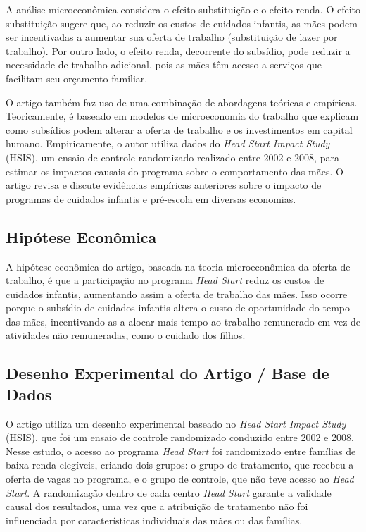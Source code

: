 \documentclass[a4paper,12pt]{article}[abntex2]
\begin{document}
A análise microeconômica considera o efeito substituição e o efeito renda. O efeito substituição sugere que, ao reduzir os custos de cuidados infantis, as mães podem ser incentivadas a aumentar sua oferta de trabalho (substituição de lazer por trabalho). Por outro lado, o efeito renda, decorrente do subsídio, pode reduzir a necessidade de trabalho adicional, pois as mães têm acesso a serviços que facilitam seu orçamento familiar.

O artigo também faz uso de uma combinação de abordagens teóricas e empíricas. Teoricamente, é baseado em modelos de microeconomia do trabalho que explicam como subsídios podem alterar a oferta de trabalho e os investimentos em capital humano. Empiricamente, o autor utiliza dados do \textit{Head Start Impact Study} (HSIS), um ensaio de controle randomizado realizado entre 2002 e 2008, para estimar os impactos causais do programa sobre o comportamento das mães. O artigo revisa e discute evidências empíricas anteriores sobre o impacto de programas de cuidados infantis e pré-escola em diversas economias.
\subsection{\textbf{Hipótese Econômica}}
A hipótese econômica do artigo, baseada na teoria microeconômica da oferta de trabalho, é que a participação no programa \textit{Head Start} reduz os custos de cuidados infantis, aumentando assim a oferta de trabalho das mães. Isso ocorre porque o subsídio de cuidados infantis altera o custo de oportunidade do tempo das mães, incentivando-as a alocar mais tempo ao trabalho remunerado em vez de atividades não remuneradas, como o cuidado dos filhos.
\subsection{\textbf{Desenho Experimental do Artigo / Base de Dados}}

O artigo utiliza um desenho experimental baseado no \textit{Head Start Impact Study} (HSIS), que foi um ensaio de controle randomizado conduzido entre 2002 e 2008. Nesse estudo, o acesso ao programa \textit{Head Start} foi randomizado entre famílias de baixa renda elegíveis, criando dois grupos: o grupo de tratamento, que recebeu a oferta de vagas no programa, e o grupo de controle, que não teve acesso ao \textit{Head Start}. A randomização dentro de cada centro \textit{Head Start} garante a validade causal dos resultados, uma vez que a atribuição de tratamento não foi influenciada por características individuais das mães ou das famílias.
\end{document}
